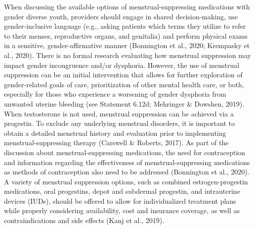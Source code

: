 \documentclass[
]{book}
\begin{document}
When discussing the available options of
menstrual-suppressing medications with gender
diverse youth, providers should engage in shared
decision-making, use gender-inclusive language
(e.g., asking patients which terms they utilize to
refer to their menses, reproductive organs, and
genitalia) and perform physical exams in a sensitive, gender-affirmative manner (Bonnington
et al., 2020; Krempasky et al., 2020). There is no
formal research evaluating how menstrual
suppression may impact gender incongruence
and/or dysphoria. However, the use of menstrual
suppression can be an initial intervention that
allows for further exploration of gender-related
goals of care, prioritization of other mental health
care, or both, especially for those who experience
a worsening of gender dysphoria from unwanted
uterine bleeding (see Statement 6.12d; Mehringer
\& Dowshen, 2019). When testosterone is not
used, menstrual suppression can be achieved via
a progestin. To exclude any underlying menstrual
disorders, it is important to obtain a detailed
menstrual history and evaluation prior to implementing menstrual-suppressing therapy (Carswell
\& Roberts, 2017). As part of the discussion about
menstrual-suppressing medications, the need for
contraception and information regarding the
effectiveness of menstrual-suppressing medications as methods of contraception also need to
be addressed (Bonnington et al., 2020). A variety
of menstrual suppression options, such as combined estrogen-progestin medications, oral progestins, depot and subdermal progestin, and
intrauterine devices (IUDs), should be offered to
allow for individualized treatment plans while
properly considering availability, cost and insurance coverage, as well as contraindications and
side effects (Kanj et al., 2019).
\end{document}
